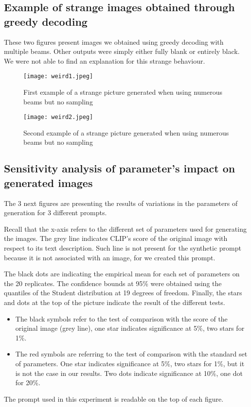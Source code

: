 \documentclass{article}
\begin{document}
\begin{appendix}
\subsection{Example of strange images obtained through greedy decoding}
\label{app:greedy-images}

These two figures present images we obtained using greedy decoding with multiple beams. Other outputs were simply either fully blank or entirely black. We were not able to find an explanation for this strange behaviour. 

\begin{figure}[H]
    \centering
    \texttt{[image: weird1.jpeg]}
    \caption{First example of a strange picture generated when using numerous beams but no sampling}
    \label{fig:gen-weird1}
\end{figure}

\begin{figure}[H]
    \centering
    \texttt{[image: weird2.jpeg]}
    \caption{Second example of a strange picture generated when using numerous beams but no sampling}
    \label{fig:gen-weird2}
\end{figure}

\pagebreak

\subsection{Sensitivity analysis of parameter's impact on generated images}
\label{app:other-gen-param}

The 3 next figures are presenting the results of variations in the parameters of generation for 3 different prompts.

Recall that the x-axis refers to the different set of parameters used for generating the images. The grey line indicates CLIP's score of the original image with respect to its text description. Such line is not present for the synthetic prompt because it is not associated with an image, for we created this prompt. 

The black dots are indicating the empirical mean for each set of parameters on the 20 replicates. The confidence bounds at 95\% were obtained using the quantiles of the Student distribution at 19 degrees of freedom. 
Finally, the stars and dots at the top of the picture indicate the result of the different tests. 
\begin{itemize}
    \item The black symbols refer to the test of comparison with the score of the original image (grey line), one star indicates significance at 5\%, two stars for 1\%.
    \item  The red symbols are referring to the test of comparison with the standard set of parameters. One star indicates significance at 5\%, two stars for 1\%, but it is not the case in our results. Two dots indicate significance at 10\%, one dot for 20\%. 
\end{itemize}
The prompt used in this experiment is readable on the top of each figure.


\end{appendix}
\end{document}

